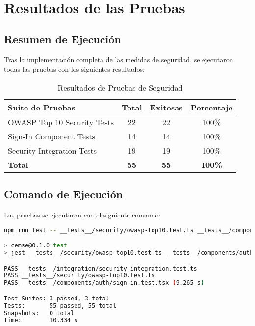 \documentclass[12pt,a4paper]{article}
\begin{document}
\section{Resultados de las Pruebas}

\subsection{Resumen de Ejecución}

Tras la implementación completa de las medidas de seguridad, se ejecutaron todas las pruebas con los siguientes resultados:

\begin{table}[H]
\centering
\begin{tabularx}{\textwidth}{|X|c|c|c|}
\hline
\textbf{Suite de Pruebas} & \textbf{Total} & \textbf{Exitosas} & \textbf{Porcentaje} \\
\hline
OWASP Top 10 Security Tests & 22 & 22 & 100\% \\
\hline
Sign-In Component Tests & 14 & 14 & 100\% \\
\hline
Security Integration Tests & 19 & 19 & 100\% \\
\hline
\textbf{Total} & \textbf{55} & \textbf{55} & \textbf{100\%} \\
\hline
\end{tabularx}
\caption{Resultados de Pruebas de Seguridad}
\end{table}

\subsection{Comando de Ejecución}

Las pruebas se ejecutaron con el siguiente comando:

\begin{lstlisting}[language=bash, caption=Ejecución de Pruebas de Seguridad]
npm run test -- __tests__/security/owasp-top10.test.ts __tests__/components/auth/sign-in.test.tsx __tests__/integration/security-integration.test.ts

> cemse@0.1.0 test
> jest __tests__/security/owasp-top10.test.ts __tests__/components/auth/sign-in.test.tsx __tests__/integration/security-integration.test.ts

PASS __tests__/integration/security-integration.test.ts
PASS __tests__/security/owasp-top10.test.ts
PASS __tests__/components/auth/sign-in.test.tsx (9.265 s)

Test Suites: 3 passed, 3 total
Tests:       55 passed, 55 total
Snapshots:   0 total
Time:        10.334 s
\end{lstlisting}
\end{document}
